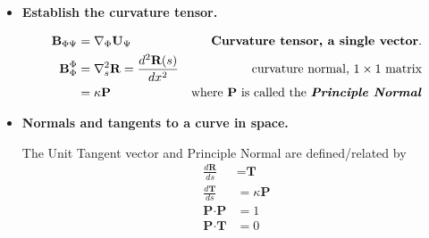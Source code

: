 \documentclass[12pt,a4paper]{report}
\newcommand{\BLUE}[1]{\textcolor{blue}{#1}}
\begin{document}
\begin{description}
\begin{itemize}
			\BLUE{Interpretation: up until this point, we've equated all of the necessary ingredients to understand tensors on a manifold/space.  In this case, a curve on a surface.  Each 'term' (in a literary sense) has more or less the same value but not the same meaning.  Furthermore, there is a tensor algebraic necessity to convert '1' in one form into '1' into another (i.e, a vector of length 1 to a metric of size 1).  The lesson here is to establish and understand how the tensor framework defines a scalar field in greater detail.}

		\item \textbf{Establish the curvature tensor.}

			\begin{align*}
				\textbf{B}_{\Phi\Psi} &= \nabla_\Phi\textbf{U}_\Psi & \text{\textbf{Curvature tensor, a single vector}.} \\
				\textbf{B}^\Phi_\Phi &= \nabla_s^2\textbf{R} = \frac{d^2\textbf{R}(s)}{dx^2} & \text{curvature normal, $1\times 1$ matrix} \\
				 &= \kappa \textbf{P} & \text{where $\textbf{P}$ is called the \textbf{\emph{Principle Normal}}}
			\end{align*}

		\item \textbf{Normals and tangents to a curve in space.}

		The Unit Tangent vector and Principle Normal are defined/related by
			\begin{align*}
				\frac{d\textbf{R}}{ds} &= \textbf{T} \\
				\frac{d\textbf{T}}{ds} &= \kappa \textbf{P} \\
				\textbf{P}\cdot\textbf{P} &= 1 \\
				\textbf{P}\cdot\textbf{T} &= 0
			\end{align*}
	\end{itemize}
\end{description}

\HLINE
\end{document}
